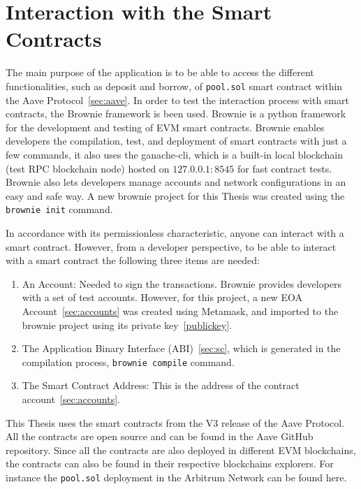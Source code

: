 \documentclass[11pt,a4paper]{report}
\begin{document}
\section{Interaction with the Smart Contracts}
The main purpose of the application is to be able to access the different functionalities, such as deposit and borrow, of \verb|pool.sol|  smart contract within the Aave Protocol~\ref{sec:aave}. In order to test the interaction process with smart contracts, the Brownie framework\cite{brow} is been used. Brownie is a python framework for the development and testing of EVM smart contracts. Brownie enables developers the compilation, test, and deployment of smart contracts with just a few commands, it also uses the ganache-cli\cite{ganache}, which is a built-in local blockchain (test RPC blockchain node) hosted on $127.0.0.1:8545$ for fast contract tests. Brownie also lets developers manage accounts and network configurations in an easy and safe way. A new brownie project for this Thesis was created using the \verb|brownie init| command.

In accordance with its permissionless characteristic, anyone can interact with a smart contract. However, from a developer perspective, to be able to interact with a smart contract the following three items are needed:
\begin{enumerate}\label{sc_interaction}
	\item An Account: Needed to sign the transactions. Brownie provides developers with a set of test accounts. However, for this project, a new EOA Account~\ref{sec:accounts} was created using Metamask\cite{wiki:MetaMask}, and imported to the brownie project using its private key~\ref{publickey}.
	\item The Application Binary Interface (ABI)~\ref{sec:sc}, which is generated in the compilation process, \verb|brownie compile| command.
	\item The Smart Contract Address: This is the address of the contract account~\ref{sec:accounts}. 
\end{enumerate}
This Thesis uses the smart contracts from the V3 release of the Aave Protocol. All the contracts are open source and can be found in the Aave GitHub repository\cite{aavegithub}. Since all the contracts are also deployed in different EVM blockchains, the contracts can also be found in their respective blockchains explorers. For instance the \verb|pool.sol| deployment in the Arbitrum Network can be found here\cite{arbiscan}.
\end{document}
